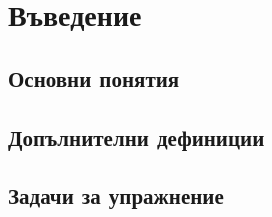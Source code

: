 \chapter{Въведение}

\section{Основни понятия}

\section{Допълнителни дефиниции}

\section{Задачи за упражнение}